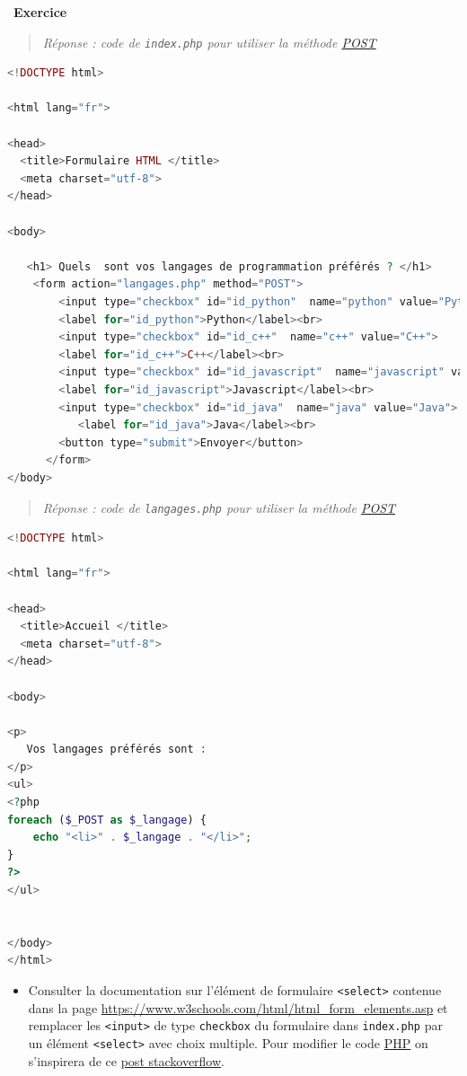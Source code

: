 \documentclass[
  11pt,
]{article}
\newcommand{\passthrough}[1]{#1}
\providecommand{\tightlist}{%
  \setlength{\itemsep}{0pt}\setlength{\parskip}{0pt}}
\newcounter{exo}
\newenvironment{exercice}[1]
{\par \medskip   \addtocounter{exo}{1} \noindent  
\begin{bclogo}[arrondi =0.1,   noborder = true, logo=\bccrayon, marge=4]{~\textbf{Exercice} \textbf{\theexo} {\itshape #1} }  \par}
{
\end{bclogo}
 \par \bigskip }
\newcounter{prog}
\begin{document}
\begin{exercice}{}
\begin{quote}
\emph{Réponse : code de \passthrough{\lstinline!index.php!} pour
utiliser la méthode \url{POST}}
\end{quote}

\begin{lstlisting}[language=PHP]
<!DOCTYPE html>

<html lang="fr">

<head>
  <title>Formulaire HTML </title>
  <meta charset="utf-8">    
</head>
 
<body>

   <h1> Quels  sont vos langages de programmation préférés ? </h1>
    <form action="langages.php" method="POST">
        <input type="checkbox" id="id_python"  name="python" value="Python">
        <label for="id_python">Python</label><br>
        <input type="checkbox" id="id_c++"  name="c++" value="C++">
        <label for="id_c++">C++</label><br>
        <input type="checkbox" id="id_javascript"  name="javascript" value="Javascript">
        <label for="id_javascript">Javascript</label><br>
        <input type="checkbox" id="id_java"  name="java" value="Java">
           <label for="id_java">Java</label><br>
        <button type="submit">Envoyer</button>
      </form> 
</body>
\end{lstlisting}

\begin{quote}
\emph{Réponse : code de \passthrough{\lstinline!langages.php!} pour
utiliser la méthode \url{POST}}
\end{quote}

\begin{lstlisting}[language=PHP]
<!DOCTYPE html>

<html lang="fr">

<head>
  <title>Accueil </title>
  <meta charset="utf-8">    
</head>
 
<body>

<p>
   Vos langages préférés sont :
</p>
<ul>
<?php  
foreach ($_POST as $_langage) {
    echo "<li>" . $_langage . "</li>";
}
?>
</ul>


</body>
</html> 
\end{lstlisting}

\begin{itemize}
\tightlist
\item
  Consulter la documentation sur l'élément de formulaire
  \passthrough{\lstinline!<select>!} contenue dans la page
  \url{https://www.w3schools.com/html/html_form_elements.asp} et
  remplacer les \passthrough{\lstinline!<input>!} de type
  \passthrough{\lstinline!checkbox!} du formulaire dans
  \passthrough{\lstinline!index.php!} par un élément
  \passthrough{\lstinline!<select>!} avec choix multiple. Pour modifier
  le code \url{PHP} on s'inspirera de ce
  \href{https://stackoverflow.com/questions/2407284/how-to-get-multiple-selected-values-of-select-box-in-php/2407401\#2407401}{post
  stackoverflow}.
\end{itemize}


\end{exercice}
\end{document}

